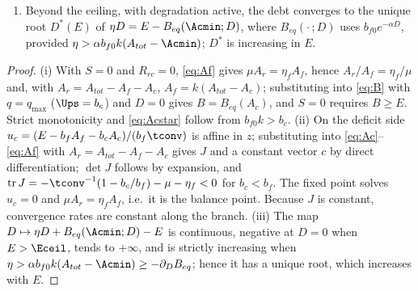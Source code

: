 \begin{proposition}
\begin{enumerate}[label=(\roman*)]
\begin{equation}
\end{equation}
and $\operatorname{tr}J<0$.
$J$ does not depend on $E$ or on the state, $\det J>0$ exactly when $B_{eq}$ is decreasing, and the fixed point of the affine system is the balance point of (i). For $B_{eq}(A_{tot})\le E<\Eceil$ the balance point lies above the typed floor and every trajectory that remains in this regime converges to it at the constant rates given by the eigenvalues of $J$; for $E>\Eceil$ the affine fixed point lies below the floor, so the trajectory approaches the face $A_c=\Acmin$ asymptotically, with a limiting persistent shortfall $S^*=E-\Eceil>0$. The ceiling is a collision of the equilibrium with a face of the admissible set, not a bifurcation of the vector field: there is no second branch, no fold, no hysteresis, and the leading eigenvalue does not tend to zero as $E\to\Eceil$.
\item Beyond the ceiling, with degradation active, the debt converges to the unique root $D^*(E)$ of $\eta D=E-B_{eq}(\Acmin;D)$, where $B_{eq}(\cdot\,;D)$ uses $b_{f0}e^{-\alpha D}$, provided $\eta>\alpha b_{f0}k(A_{tot}-\Acmin)$; $D^*$ is increasing in $E$.
\end{enumerate}
\end{proposition}

\begin{proof}
(i) With $S=0$ and $R_{rc}=0$, \eqref{eq:Af} gives $\mu A_r=\eta_fA_f$, hence $A_r/A_f=\eta_f/\mu$ and, with $A_r=A_{tot}-A_f-A_c$, $A_f=k(A_{tot}-A_c)$; substituting into \eqref{eq:B} with $q=q_{\max}$ ($\Ups=b_c$) and $D=0$ gives $B=B_{eq}(A_c)$, and $S=0$ requires $B\ge E$. Strict monotonicity and \eqref{eq:Acstar} follow from $b_{f0}k>b_c$. (ii) On the deficit side $u_c=(E-b_fA_f-b_cA_c)/(b_f\tconv)$ is affine in $z$; substituting into \eqref{eq:Ac}--\eqref{eq:Af} with $A_r=A_{tot}-A_f-A_c$ gives $J$ and a constant vector $c$ by direct differentiation; $\det J$ follows by expansion, and $\operatorname{tr}J=-\tconv^{-1}(1-b_c/b_f)-\mu-\eta_f<0$ for $b_c<b_f$. The fixed point solves $u_c=0$ and $\mu A_r=\eta_fA_f$, i.e.\ it is the balance point. Because $J$ is constant, convergence rates are constant along the branch. (iii) The map $D\mapsto\eta D+B_{eq}(\Acmin;D)-E$ is continuous, negative at $D=0$ when $E>\Eceil$, tends to $+\infty$, and is strictly increasing when $\eta>\alpha b_{f0}k(A_{tot}-\Acmin)\ge-\partial_DB_{eq}$; hence it has a unique root, which increases with $E$.
\end{proof}

